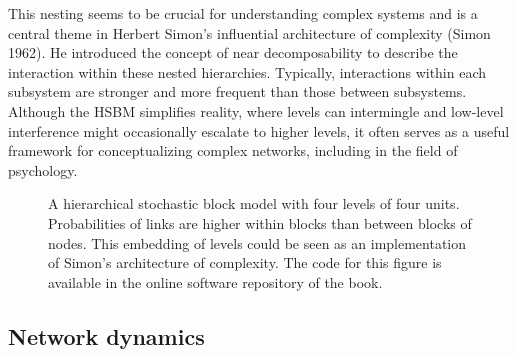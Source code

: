 \documentclass[
  a4paper,
  DIV=11,
  numbers=noendperiod,
  oneside]{scrreprt}
\begin{document}
This nesting seems to be crucial for understanding complex systems and
is a central theme in Herbert Simon's influential architecture of
complexity (Simon 1962). He introduced the concept of near
decomposability to describe the interaction within these nested
hierarchies. Typically, interactions within each subsystem are stronger
and more frequent than those between subsystems. Although the HSBM
simplifies reality, where levels can intermingle and low-level
interference might occasionally escalate to higher levels, it often
serves as a useful framework for conceptualizing complex networks,
including in the field of psychology.

\begin{figure}


\caption{\label{fig-ch6-extra}A hierarchical stochastic block model with
four levels of four units. Probabilities of links are higher within
blocks than between blocks of nodes. This embedding of levels could be
seen as an implementation of Simon's architecture of complexity. The
code for this figure is available in the online software repository of
the book.}

\end{figure}%

\subsection{Network dynamics}\label{sec-Network-dynamics}
\end{document}
